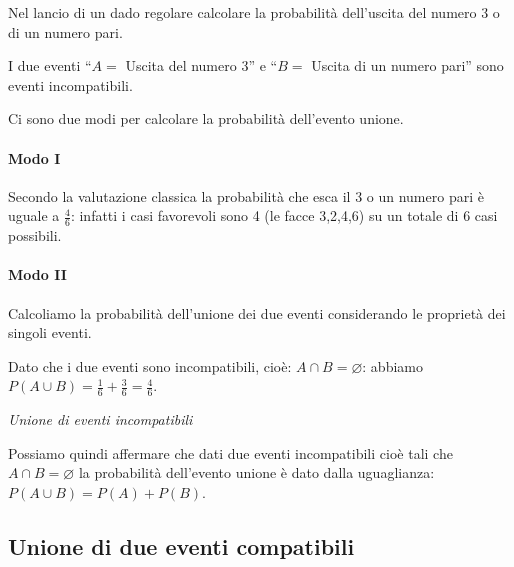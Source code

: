 \begin{esempio}
Nel lancio di un dado regolare calcolare la probabilità dell'uscita del 
numero 3 o di un numero pari.

I due eventi ``\( A= \) Uscita del numero 3'' e ``\( B= \) Uscita di un 
numero pari'' sono eventi incompatibili.

Ci sono due modi per calcolare la probabilità dell'evento unione.

\begin{minipage}{.59\textwidth}
\paragraph{Modo I} Secondo la valutazione classica la probabilità che esca 
il \(3\) o un numero pari è uguale a \(\frac 4 6\): infatti i casi favorevoli 
sono 4 (le facce 3,2,4,6) su un totale di \(6\) casi possibili.
\paragraph{Modo II} Calcoliamo la probabilità dell'unione dei due eventi 
considerando le proprietà dei singoli eventi. 

Dato che i due eventi sono incompatibili, cioè: \(A\cap B=\varnothing \): 
abbiamo \(P(A\cup B)=\frac 1 6+\frac 3 6=\frac 4 6\).
\end{minipage}
\hfill
\begin{minipage}{.39\textwidth}
\begin{center}
\unioneincompatibili
\emph{Unione di eventi incompatibili}
\end{center}
\end{minipage}

\end{esempio}

Possiamo quindi affermare che dati due eventi incompatibili cioè tali che 
\(A\cap 
B=\varnothing \) la probabilità dell'evento unione è dato dalla uguaglianza: 
\(P(A\cup B)=P(A)+P(B)\).


\subsection{Unione di due eventi compatibili}

